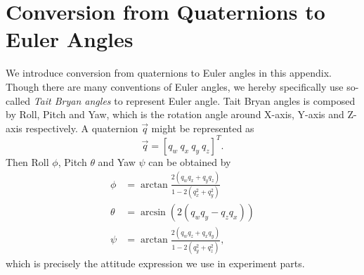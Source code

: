 \chapter{Conversion from Quaternions to Euler Angles}
\label{chap:appendix3}

We introduce conversion from quaternions to Euler angles in this appendix. Though there are many conventions of Euler angles, we hereby specifically use so-called \textit{Tait Bryan angles} to represent Euler angle. Tait Bryan angles is composed by Roll, Pitch and Yaw, which is the rotation angle around X-axis, Y-axis and Z-axis respectively. A quaternion $\vec{q}$ might be represented as
\begin{equation}
	\vec{q} = \left[ q_w \ q_x \ q_y \ q_z \right]^T.
\end{equation}
Then Roll $\phi$, Pitch $\theta$ and Yaw $\psi$ can be obtained by
\begin{align}
	\phi &= \arctan{\frac{2(q_w q_x+q_y q_z)}{1-2(q_x^2+q_y^2)}}\\
	\theta &= \arcsin{(2(q_wq_y-q_zq_x))}\\
	\psi &= \arctan{\frac{2(q_w q_z+q_x q_y)}{1-2(q_y^2+q_z^2)}},
\end{align}
which is precisely the attitude expression we use in experiment parts.
\clearpage
\newpage
